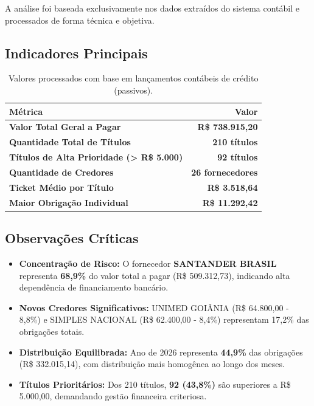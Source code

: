 \documentclass[12pt, a4paper]{article}
\newcommand{\reais}[1]{R\$ #1}
\begin{document}
A análise foi baseada exclusivamente nos dados extraídos do sistema contábil e processados de forma técnica e objetiva.

\subsection{Indicadores Principais}

\begin{table}[H]
    \centering
    \large
    \renewcommand{\arraystretch}{1.5}
    \begin{tabularx}{0.9\textwidth}{X r}
        \toprule
        \rowcolor{tableHeader} \textbf{Métrica} & \textbf{Valor} \\
        \midrule
        \textbf{Valor Total Geral a Pagar} & \textbf{\reais{738.915,20}} \\
        \textbf{Quantidade Total de Títulos} & \textbf{210 títulos} \\
        \textbf{Títulos de Alta Prioridade (> R\$ 5.000)} & \textbf{92 títulos} \\
        \textbf{Quantidade de Credores} & \textbf{26 fornecedores} \\
        \textbf{Ticket Médio por Título} & \textbf{\reais{3.518,64}} \\
        \midrule
        \rowcolor{accentColor!10} \textbf{Maior Obrigação Individual} & \textcolor{accentColor}{\textbf{\reais{11.292,42}}} \\
        \bottomrule
    \end{tabularx}
    \caption*{\footnotesize Valores processados com base em lançamentos contábeis de crédito (passivos).}
\end{table}

\subsection{Observações Críticas}

\begin{itemize}
    \item \textbf{Concentração de Risco:} O fornecedor \textbf{SANTANDER BRASIL} representa \textbf{68,9\%} do valor total a pagar (\reais{509.312,73}), indicando alta dependência de financiamento bancário.

    \item \textbf{Novos Credores Significativos:} UNIMED GOIÂNIA (\reais{64.800,00} - 8,8\%) e SIMPLES NACIONAL (\reais{62.400,00} - 8,4\%) representam 17,2\% das obrigações totais.

    \item \textbf{Distribuição Equilibrada:} Ano de 2026 representa \textbf{44,9\%} das obrigações (\reais{332.015,14}), com distribuição mais homogênea ao longo dos meses.

    \item \textbf{Títulos Prioritários:} Dos 210 títulos, \textbf{92 (43,8\%)} são superiores a R\$ 5.000,00, demandando gestão financeira criteriosa.
\end{itemize}
\end{document}
